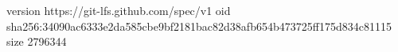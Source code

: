 version https://git-lfs.github.com/spec/v1
oid sha256:34090ac6333e2da585cbe9bf2181bac82d38afb654b473725ff175d834c81115
size 2796344
